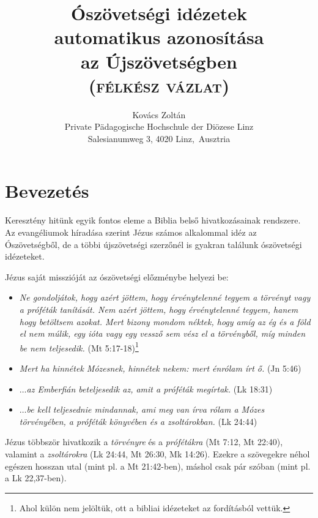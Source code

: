 \documentclass{article}
\newcommand\hu{\selectlanguage{magyar}\frenchspacing}
\newcommand\de{\selectlanguage{german}\frenchspacing}
\begin{document}
\hu
\title{Ószövetségi idézetek \\automatikus azonosítása\\ az Újszövetségben\\
\textsc{(félkész vázlat)}}
\author{Kovács Zoltán\\ \de Private Pädagogische Hochschule der Diözese Linz\\
Salesianumweg 3, 4020 Linz,\hu\ Ausztria}
\maketitle

\section{Bevezetés}
Keresztény hitünk egyik fontos eleme a Biblia belső hivatkozásainak rendszere.
Az evangéliumok híradása szerint Jézus számos alkalommal idéz az Ószövetségből, de
a többi újszövetségi szerzőnél is gyakran találunk ószövetségi idézeteket.

Jézus saját misszióját az ószövetségi előzménybe helyezi be:
\begin{itemize}
\item \textit{Ne gondoljátok, hogy azért jöttem, hogy érvénytelenné tegyem a törvényt
vagy a próféták tanítását. Nem azért jöttem, hogy érvénytelenné tegyem, hanem hogy betöltsem azokat.
Mert bizony mondom néktek, hogy amíg az ég és a föld el nem múlik, egy ióta vagy egy vessző
sem vész el a törvényből, míg minden be nem teljesedik.} (Mt 5:17-18)\footnote{Ahol külön
nem jelöltük, ott a bibliai idézeteket az \cite{UFO} fordításból vettük.}
\item \textit{Mert ha hinnétek Mózesnek, hinnétek nekem: mert énrólam írt ő.} (Jn 5:46)
\item \textit{$\ldots$az Emberfián beteljesedik az, amit a próféták megírtak.} (Lk 18:31)
\item \textit{$\ldots$be kell teljesednie mindannak, ami meg van írva rólam a Mózes törvényében,
a próféták könyvében és a zsoltárokban.} (Lk 24:44)
\end{itemize}
Jézus többször hivatkozik a \textit{törvényre} és a \textit{prófétákra} (Mt 7:12, Mt 22:40), valamint
a \textit{zsoltárokra} (Lk 24:44, Mt 26:30, Mk 14:26). Ezekre a szövegekre néhol egészen hosszan utal
(mint pl. a Mt 21:42-ben), máshol csak pár szóban (mint pl. a Lk 22,37-ben).
\end{document}
